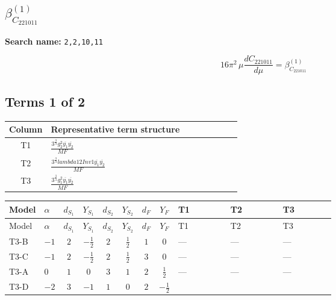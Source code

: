 \documentclass[8pt]{article}
\begin{document}
\begin{landscape}
\section*{$\beta_{C_{221011}}^{(1)}$}
\noindent\textbf{Search name: }\texttt{2,2,10,11}\par\smallskip
\[16\pi^2\,\mu\frac{d C_{221011}}{d\mu}=\beta_{C_{221011}}^{(1)}\]
\subsection*{Terms 1 of 2}
\begin{center}
\begin{tabular}{@{}c >{\raggedright\arraybackslash}p{0.82\linewidth}@{}}
\toprule
Column & Representative term structure \\
\midrule
T1 & \(\displaystyle \frac{3^{\frac{3}{4}} g_{2}^{2} \overline{y_{1}} \overline{y_{2}}}{MF}\) \\
\midrule
T2 & \(\displaystyle \frac{3^{\frac{3}{4}} lambda12Inv1 \overline{y_{1}} \overline{y_{2}}}{MF}\) \\
\midrule
T3 & \(\displaystyle \frac{3^{\frac{3}{4}} g_{1}^{2} \overline{y_{1}} \overline{y_{2}}}{MF}\) \\
\midrule
\bottomrule
\end{tabular}
\end{center}
\smallskip
\tiny
\begin{longtable}{@{}llcccccc >{\raggedright\arraybackslash}p{0.21\linewidth} >{\raggedright\arraybackslash}p{0.21\linewidth} >{\raggedright\arraybackslash}p{0.21\linewidth}@{}}
\toprule
Model & $\alpha$ & $d_{S_1}$ & $Y_{S_1}$ & $d_{S_2}$ & $Y_{S_2}$ & $d_F$ & $Y_F$ & T1 & T2 & T3 \\
\midrule
\endfirsthead
\toprule
Model & $\alpha$ & $d_{S_1}$ & $Y_{S_1}$ & $d_{S_2}$ & $Y_{S_2}$ & $d_F$ & $Y_F$ & T1 & T2 & T3 \\
\midrule
\endhead
T3-B & $-1$ & $2$ & $-\frac{1}{2}$ & $2$ & $\frac{1}{2}$ & $1$ & $0$ & --- & --- & --- \\
\midrule
T3-C & $-1$ & $2$ & $-\frac{1}{2}$ & $2$ & $\frac{1}{2}$ & $3$ & $0$ & --- & --- & --- \\
\midrule
T3-A & $0$ & $1$ & $0$ & $3$ & $1$ & $2$ & $\frac{1}{2}$ & --- & --- & --- \\
\midrule
T3-D & $-2$ & $3$ & $-1$ & $1$ & $0$ & $2$ & $-\frac{1}{2}$ & \scriptsize\adjustbox{max width=\linewidth}{$\begin{gathered} - \frac{17 \cdot 3^{\frac{3}{4}} g_{2}^{2} \overline{y_{1}} \overline{y_{2}}}{24 MF}\end{gathered}$} & \scriptsize\adjustbox{max width=\linewidth}{$\begin{gathered} - \frac{3^{\frac{3}{4}} lambda12Inv1 \overline{y_{1}} \overline{y_{2}}}{6 MF}\end{gathered}$} & \scriptsize\adjustbox{max width=\linewidth}{$\begin{gathered} - \frac{3^{\frac{3}{4}} g_{1}^{2} \overline{y_{1}} \overline{y_{2}}}{8 MF}\end{gathered}$} \\

\end{longtable}
\end{landscape}
\end{document}
